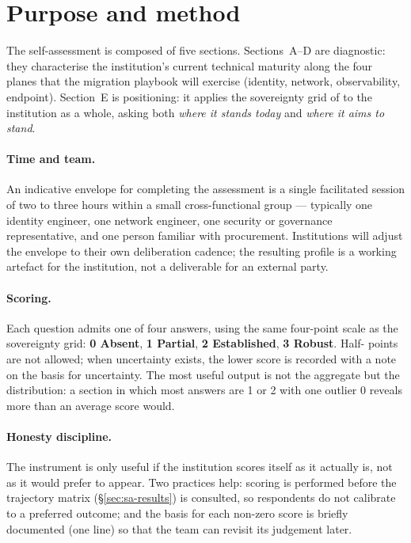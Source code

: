 \section{Purpose and method}
\label{sec:sa-purpose}

The self-assessment is composed of five sections. Sections~A--D are
diagnostic: they characterise the institution's current technical
maturity along the four planes that the migration playbook will
exercise (identity, network, observability, endpoint). Section~E is
positioning: it applies the sovereignty grid of
 to the institution as a whole, asking
both \emph{where it stands today} and \emph{where it aims to stand}.

\paragraph{Time and team.} An indicative envelope for completing the
assessment is a single facilitated session of two to three hours
within a small cross-functional group --- typically one identity
engineer, one network engineer, one security or governance
representative, and one person familiar with procurement. Institutions
will adjust the envelope to their own deliberation cadence; the
resulting profile is a working artefact for the institution, not a
deliverable for an external party.

\paragraph{Scoring.} Each question admits one of four answers, using
the same four-point scale as the sovereignty grid: \textbf{0 Absent},
\textbf{1 Partial}, \textbf{2 Established}, \textbf{3 Robust}. Half-
points are not allowed; when uncertainty exists, the lower score is
recorded with a note on the basis for uncertainty. The most useful
output is not the aggregate but the distribution: a section in which
most answers are 1 or 2 with one outlier 0 reveals more than an
average score would.

\paragraph{Honesty discipline.} The instrument is only useful if the
institution scores itself as it actually is, not as it would prefer to
appear. Two practices help: scoring is performed before the trajectory
matrix (\S\ref{sec:sa-results}) is consulted, so respondents do not
calibrate to a preferred outcome; and the basis for each non-zero
score is briefly documented (one line) so that the team can revisit
its judgement later.

